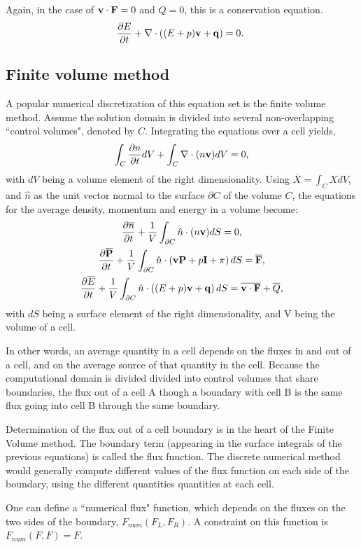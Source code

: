 Again, in the case of $\mathbf{v}\cdot\mathbf{F} = 0$ and $Q=0$, this is a conservation equation. 
\begin{gather}
    \frac{\partial E}{\partial t} + \nabla \cdot\left((E + p)\mathbf{v} +\mathbf{q}\right) =  0.~\label{eq:energy_conservation}
\end{gather}

\subsection*{Finite volume method}

A popular numerical discretization of this equation set is the finite volume method. Assume the solution domain is divided into several non-overlapping ``control volumes", denoted by $C$. Integrating the equations over a cell yields,
\begin{gather}
	\int_C\frac{\partial n}{\partial t}dV + \int_C \nabla \cdot (n \mathbf{v})dV = 0,
\end{gather}
with $dV$ being a volume element of the right dimensionality. Using $\overline X = \int_C X dV$, and $\hat n$ as the unit vector normal to the surface $\partial C$ of the volume $C$, the equations for the average density, momentum and energy in a volume become:
\begin{gather}
	\frac{\partial \overline n}{\partial t} + \frac{1}{V}\int_{\partial C} \hat n \cdot (n \mathbf{v})dS = 0,\\
    	\frac{\partial \overline {\mathbf{P}}}{\partial t} + \frac{1}{V} \int_{\partial C} \hat n  \cdot\left(\mathbf{v} \mathbf{P} + p \mathbf{I} + \pi\right)dS = \overline {\mathbf{F}},\\
    	\frac{\partial \overline E}{\partial t} +   \frac{1}{V}\int_{\partial C} \hat n \cdot \left( (E + p)\mathbf{v}+\mathbf{q}\right)dS =  \overline{\mathbf{v}\cdot\mathbf{F}}+ \overline Q,
\end{gather}
with $dS$ being a surface element of the right dimensionality, and V being the volume of a cell.

In other words, an average quantity in a cell depends on the fluxes in and out of a cell, and on the average source of that quantity in the cell. Because the computational domain is divided divided into control volumes that share boundaries, the flux out of a cell A though a boundary with cell B is the same flux going into cell B through the same boundary.

Determination of the flux out of a cell boundary is in the heart of the Finite Volume method. The boundary term (appearing in the surface integrals of the previous equations) is called the flux function. The discrete numerical method would generally compute different values of the flux function on each side of the boundary, using the different quantities quantities at each cell.

One can define a ``numerical flux" function, which depends on the fluxes on the two sides of the boundary, $F_{num}(F_L, F_R)$. A constraint on this function is $F_{num}(F, F) = F$. 
























